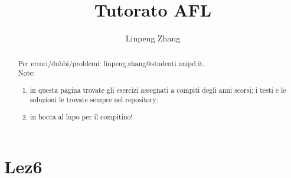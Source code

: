 \documentclass[a4paper,11pt]{article}
\begin{document}
\author{Linpeng Zhang}
\title{Tutorato AFL}
\maketitle
\begin{abstract}
    Per errori/dubbi/problemi: linpeng.zhang@studenti.unipd.it.
    \\Note:
    \begin{enumerate}
        \item in questa pagina trovate gli esercizi assegnati a compiti degli anni scorsi; i testi e le soluzioni le trovate sempre nel repository;
        \item in bocca al lupo per il compitino!
    \end{enumerate}
\end{abstract}
\tableofcontents
\section{Lez6}
\end{document}
